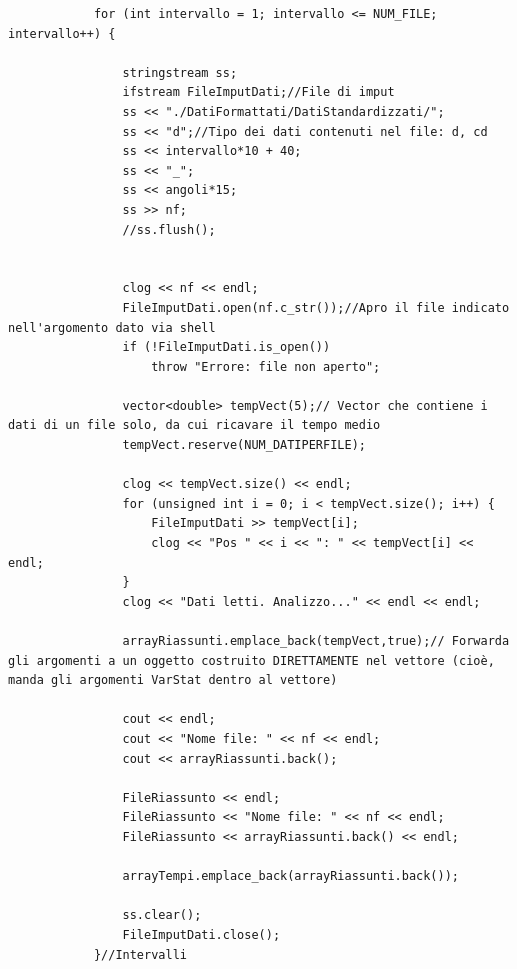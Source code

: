 \documentclass[12pt]{article} %
\begin{document}
\begin{verbatim}
			for (int intervallo = 1; intervallo <= NUM_FILE; intervallo++) {

				stringstream ss;
				ifstream FileImputDati;//File di imput
				ss << "./DatiFormattati/DatiStandardizzati/";
				ss << "d";//Tipo dei dati contenuti nel file: d, cd
				ss << intervallo*10 + 40;
				ss << "_";
				ss << angoli*15;
				ss >> nf;
				//ss.flush();


				clog << nf << endl;
				FileImputDati.open(nf.c_str());//Apro il file indicato nell'argomento dato via shell
				if (!FileImputDati.is_open())
					throw "Errore: file non aperto";

				vector<double> tempVect(5);// Vector che contiene i dati di un file solo, da cui ricavare il tempo medio
				tempVect.reserve(NUM_DATIPERFILE);

				clog << tempVect.size() << endl;
				for (unsigned int i = 0; i < tempVect.size(); i++) {
					FileImputDati >> tempVect[i];
					clog << "Pos " << i << ": " << tempVect[i] << endl;
				}
				clog << "Dati letti. Analizzo..." << endl << endl;

				arrayRiassunti.emplace_back(tempVect,true);// Forwarda gli argomenti a un oggetto costruito DIRETTAMENTE nel vettore (cioè, manda gli argomenti VarStat dentro al vettore)

				cout << endl;
				cout << "Nome file: " << nf << endl;
				cout << arrayRiassunti.back();

				FileRiassunto << endl;
				FileRiassunto << "Nome file: " << nf << endl;
				FileRiassunto << arrayRiassunti.back() << endl;

				arrayTempi.emplace_back(arrayRiassunti.back());

				ss.clear();
				FileImputDati.close();
			}//Intervalli



\end{verbatim}
\end{document}
